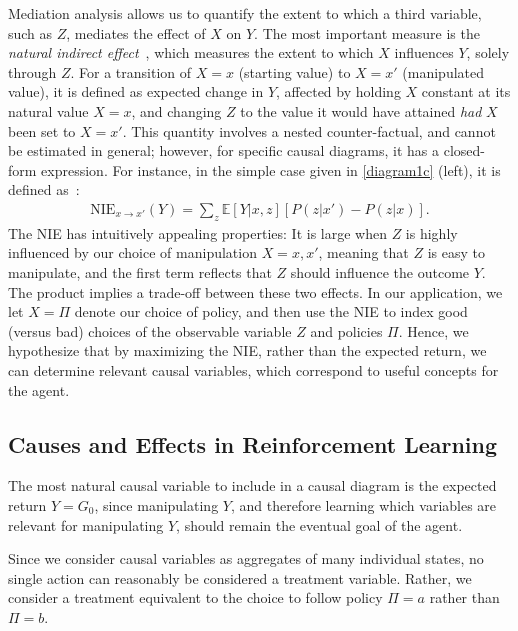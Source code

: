 \documentclass[letterpaper]{article} %
\newcommand{\EE}{\mathbb{E}}
\newcommand{\NIE}{\textrm{NIE}\xspace}
\begin{document}
	Mediation analysis allows us to quantify the extent to which a third variable, such as $Z$, mediates the effect of $X$ on $Y$. The most important measure is the \emph{natural indirect effect}~\cite{pearl2012mediation,pearl2001direct}, which measures the extent to which $X$ influences $Y$, solely through $Z$. For a transition of $X=x$ (starting value) to $X=x'$ (manipulated value), it is defined as expected change in $Y$, affected by holding $X$ constant at its natural value $X=x$, and changing $Z$ to the value it would have attained \emph{had} $X$ been set to $X=x'$. This quantity involves a nested counter-factual, and cannot be estimated in general; however, for specific causal diagrams, it has a closed-form expression. For instance, in the simple case given in \cref{diagram1c} (left), it is defined as~\cite{pearl2001direct}:
	\begin{align}
		\NIE_{x \rightarrow x'}(Y) = \sum_z \EE\left[Y | x,z\right][ P(z | x') - P(z | x)].\label{eqNIE}
	\end{align}
	The \NIE has intuitively appealing properties: It is large when $Z$ is highly influenced by our choice of manipulation $X=x, x'$, meaning that $Z$ is easy to manipulate, and the first term reflects that $Z$ should influence the outcome $Y$. The product implies a trade-off between these two effects. In our application, we let $X=\Pi$ denote our choice of policy, and then use the \NIE to index good (versus bad) choices of the observable variable $Z$ and policies $\Pi$. Hence, we hypothesize that by maximizing the \NIE, rather than the expected return, we can determine relevant causal variables, which correspond to useful concepts for the agent.

	\subsection{Causes and Effects in Reinforcement Learning}
	The most natural causal variable to include in a causal diagram is the expected return $Y= G_0$, since manipulating $Y$, and therefore learning which variables are relevant for manipulating $Y$, should remain the eventual goal of the agent.

	Since we consider causal variables as aggregates of many individual states, no single action can reasonably be considered a treatment variable. Rather, we consider a treatment equivalent to the choice to follow policy $\Pi = a$ rather than $\Pi = b$.
\end{document}
